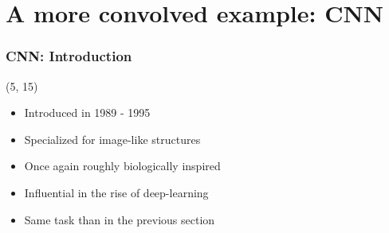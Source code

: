 \section{A more convolved example: \acl{CNN}}


\begin{frame}
  \frametitle{\acl{CNN}: Introduction}

  \begin{textblock}{90}(5, 15)
    \begin{itemize}
    \item Introduced in 1989 - 1995
    \item Specialized for image-like structures
    \item Once again roughly biologically inspired
    \item Influential in the rise of deep-learning
    \item Same task than in the previous section
    \end{itemize}
  \end{textblock}
\end{frame}



